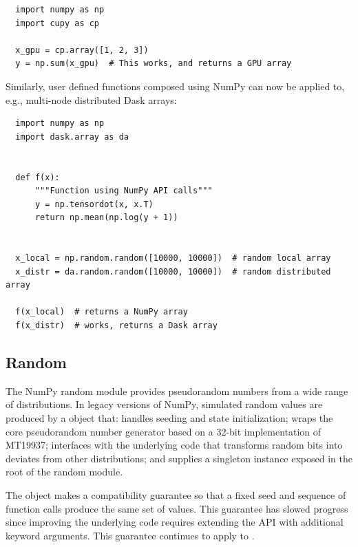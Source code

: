 \begin{lstlisting}
  import numpy as np
  import cupy as cp

  x_gpu = cp.array([1, 2, 3])
  y = np.sum(x_gpu)  # This works, and returns a GPU array
\end{lstlisting}

Similarly, user defined functions composed using NumPy can now be
applied to, e.g., multi-node distributed Dask arrays:

\begin{lstlisting}
  import numpy as np
  import dask.array as da


  def f(x):
      """Function using NumPy API calls"""
      y = np.tensordot(x, x.T)
      return np.mean(np.log(y + 1))


  x_local = np.random.random([10000, 10000])  # random local array
  x_distr = da.random.random([10000, 10000])  # random distributed array

  f(x_local)  # returns a NumPy array
  f(x_distr)  # works, returns a Dask array
\end{lstlisting}

\subsection*{Random}


The NumPy random module provides pseudorandom numbers from a wide range of
distributions. In legacy versions of NumPy, simulated random values are produced
by a  object that: handles seeding and state initialization;
wraps the core pseudorandom number generator based on a 32-bit implementation of
MT19937; interfaces with the underlying code that transforms random bits into
deviates from other distributions; and supplies a singleton instance exposed in
the root of the random module.

The  object makes a compatibility guarantee so that a fixed
seed and sequence of function calls produce the same set of values. This
guarantee has slowed progress since improving the underlying code requires
extending the API with additional keyword arguments. This guarantee continues to
apply to . 

